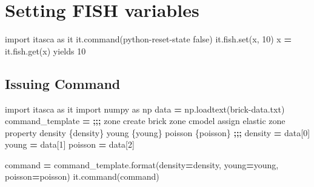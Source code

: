 \documentclass[a4paper, nobind]{templates/ociamthesis}
\newenvironment{Shaded}{\begin{snugshade}}{\end{snugshade}}
\newcommand{\BuiltInTok}[1]{#1}
\newcommand{\DecValTok}[1]{\textcolor[rgb]{0.00,0.00,0.81}{#1}}
\newcommand{\ImportTok}[1]{#1}
\newcommand{\NormalTok}[1]{#1}
\newcommand{\OperatorTok}[1]{\textcolor[rgb]{0.81,0.36,0.00}{\textbf{#1}}}
\newcommand{\StringTok}[1]{\textcolor[rgb]{0.31,0.60,0.02}{#1}}
\renewenvironment{Shaded}
{
  \vspace{10pt}%
  \begin{snugshade}%
}{%
  \end{snugshade}%
  \vspace{8pt}%
}
\begin{document}
\hypertarget{setting-fish-variables}{%
\section{Setting FISH variables}\label{setting-fish-variables}}

\begin{Shaded}
\begin{Highlighting}[]
\ImportTok{import}\NormalTok{ itasca }\ImportTok{as}\NormalTok{ it}
\NormalTok{it.command(}\StringTok{\textquotesingle{}python{-}reset{-}state false\textquotesingle{}}\NormalTok{)}
\NormalTok{it.fish.}\BuiltInTok{set}\NormalTok{(}\StringTok{\textquotesingle{}x\textquotesingle{}}\NormalTok{, }\DecValTok{10}\NormalTok{)}
\NormalTok{x }\OperatorTok{=}\NormalTok{ it.fish.get(}\StringTok{\textquotesingle{}x\textquotesingle{}}\NormalTok{) yields }\DecValTok{10}
\end{Highlighting}
\end{Shaded}

\hypertarget{issuing-command}{%
\subsection{Issuing Command}\label{issuing-command}}

\begin{Shaded}
\begin{Highlighting}[]
\ImportTok{import}\NormalTok{ itasca }\ImportTok{as}\NormalTok{ it}
\ImportTok{import}\NormalTok{ numpy }\ImportTok{as}\NormalTok{ np}
\NormalTok{data }\OperatorTok{=}\NormalTok{ np.loadtext(}\StringTok{\textquotesingle{}brick{-}data.txt\textquotesingle{}}\NormalTok{)}
\NormalTok{command\_template }\OperatorTok{=} \OperatorTok{;;;} 
\NormalTok{zone create brick}
\NormalTok{zone cmodel assign elastic}
\NormalTok{zone }\BuiltInTok{property}\NormalTok{ density \{density\} young \{young\} poisson \{poisson\}}
\OperatorTok{;;;}
\NormalTok{density }\OperatorTok{=}\NormalTok{ data[}\DecValTok{0}\NormalTok{]}
\NormalTok{young }\OperatorTok{=}\NormalTok{ data[}\DecValTok{1}\NormalTok{]}
\NormalTok{poisson }\OperatorTok{=}\NormalTok{ data[}\DecValTok{2}\NormalTok{]}

\NormalTok{command }\OperatorTok{=}\NormalTok{ command\_template.}\BuiltInTok{format}\NormalTok{(density}\OperatorTok{=}\NormalTok{density, young}\OperatorTok{=}\NormalTok{young, poisson}\OperatorTok{=}\NormalTok{poisson)}
\NormalTok{it.command(command)}
\end{Highlighting}
\end{Shaded}
\end{document}

